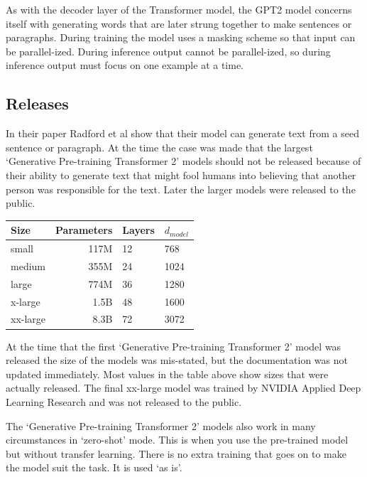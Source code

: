 As with the decoder layer of the Transformer model, the GPT2 model concerns itself with generating words that are later strung together to make sentences or paragraphs. During training the model uses a masking scheme so that input can be parallel-ized. During inference output cannot be parallel-ized, so during inference output must focus on one example at a time.

\subsection{Releases}
In their paper Radford et al \cite{radford2019language} show that their model can generate text from a seed sentence or paragraph. At the time the case was made that the largest `Generative Pre-training Transformer 2' models should not be released because of their ability to generate text that might fool humans into believing that another person was responsible for the text. Later the larger models were released to the public.

\begin{center}

\begin{tabular}{lrll}
	Size & Parameters & Layers & $d_{model}$ \\
	\hline
	small & 117M       & 12     & 768          \\
	medium & 355M       & 24     & 1024         \\
	large & 774M       & 36     & 1280         \\
	x-large & 1.5B     & 48     & 1600 \\
	xx-large & 8.3B   &  72 &   3072 
\end{tabular}

	
\end{center}

At the time that the first `Generative Pre-training Transformer 2' model was released the size of the models was mis-stated, but the documentation was not updated immediately. Most values in the table above show sizes that were actually released. The final xx-large model was trained by NVIDIA Applied Deep Learning Research \cite{2019NVIDIAadlr} and was not released to the public.

The `Generative Pre-training Transformer 2' models also work in many circumstances in `zero-shot' mode. This is when you use the pre-trained model but without transfer learning. There is no extra training that goes on to make the model suit the task. It is used `as is'.

